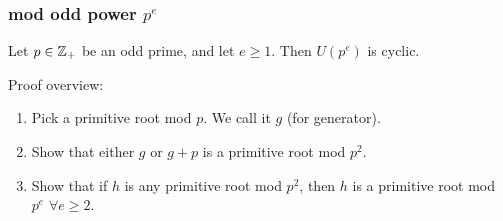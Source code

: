 \subsubsection{mod odd power \texorpdfstring{$p^e$}{p\^e}}
\begin{theorem}\label{thm:generators-in-powers-of-p}
    Let $p\in \mathbb Z_+$ be an odd prime, and let $e\geq 1$. Then $U(p^e)$ is cyclic.
\end{theorem}
Proof overview:
\begin{enumerate}[1.]
    \item Pick a primitive root mod $p$. We call it $g$ (for generator).
    \item Show that either $g$ or $g + p$ is a primitive root mod $p^2$.
    \item Show that if $h$ is any primitive root mod $p^2$, then $h$ is a primitive root mod $p^e$ $\forall e\geq 2$.
\end{enumerate}
